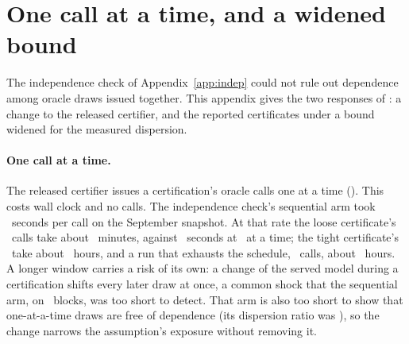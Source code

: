 \begin{table}[t]
\caption{The replication analysis of the headline pair
(Table~\ref{tab:main}, presented-cells estimand) uses the stored labels
of Table~\ref{tab:main} and each fresh draw (draws 1 to 3) of the three-draw relabeling as the label. It reports flip
rates overall and per cached-value stratum, and mean savings with the
certification rate in parentheses, in percent over \bootB\
replications. Draw 3 is missing for one row, so that labeling
covers \ rows.}
\label{tab:labelnoise}
\centering\footnotesize
\setlength{\tabcolsep}{3pt}

\end{table}

\FloatBarrier
\keepheading
\section{One call at a time, and a widened bound}
\label{app:widen}
The independence check of Appendix~\ref{app:indep} could not rule out
dependence among oracle draws issued together. This appendix gives the
two responses of \secref{sec:exp-validity}: a change to the released
certifier, and the reported certificates under a bound widened for the
measured dispersion.

\keeprunin
\paragraph{One call at a time.} The released certifier issues a
certification's oracle calls one at a time (). This
costs wall clock and no calls. The independence check's sequential arm
took \seqSecondsPerCall\ seconds per call on the September snapshot. At
that rate the loose certificate's \sepOracleLoose\ calls take about
\seqWallLooseMinutes\ minutes, against \sepWallLoose\ seconds at
\deployConcurrency\ at a time; the tight certificate's \sepOracleTight\
take about \seqWallTightHours\ hours, and a run that exhausts the
schedule, \seqWallMaxCalls\ calls, about \seqWallMaxHours\ hours. A
longer window carries a risk of its own: a change of the served model
during a certification shifts every later draw at once, a common shock
that the sequential arm, on \indepSeqBlocks\ blocks, was too short to
detect.
That arm is also too short to show that one-at-a-time draws are free of
dependence (its dispersion ratio was \indepSeqDispersion), so the change
narrows the assumption's exposure without removing it.

\keeprunin
